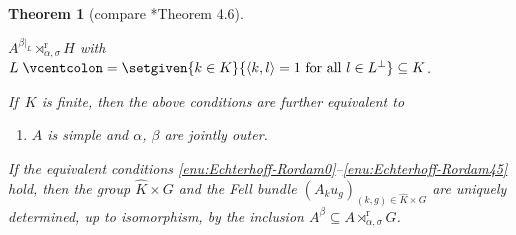 \documentclass[a4paper]{amsart}
\theoremstyle{plain}
\newtheorem{theorem}{Theorem}
\theoremstyle{definition}
\theoremstyle{remark}
\numberwithin{theorem}{section}
\numberwithin{equation}{section}
\newcommand*{\red}{\mathrm{r}}%
\newcommand*{\defeq}{\mathrel{\vcentcolon=}}%
\begin{document}
\begin{theorem}[compare \cite{Echterhoff-Rordam:Inclusions}*{Theorem
    4.6}]
\begin{enumerate}
    \(A^{\beta|_L}\rtimes^\red_{\alpha,\sigma} H\) with \(L\defeq
    \setgiven{k \in K}{\langle k ,l\rangle=1 \text{ for all }l\in
      L^\bot}\subseteq K\).
  \end{enumerate}
  If~\(K\) is finite, then the above conditions are further equivalent
  to
  \begin{enumerate}[resume]
  \item \label{enu:Echterhoff-Rordam5}%
    \(A\) is simple and \(\alpha\), \(\beta\) are jointly outer.
  \end{enumerate}
  If the equivalent conditions
  \ref{enu:Echterhoff-Rordam0}--\ref{enu:Echterhoff-Rordam45} hold,
  then the group \(\widehat{K}\times G\) and the Fell bundle
  \((A_ku_g)_{(k,g)\in \widehat{K}\times G}\) are uniquely determined,
  up to isomorphism, by the inclusion \(A^\beta\subseteq
  A\rtimes_{\alpha,\sigma}^\red G\).
\end{theorem}
\end{document}
